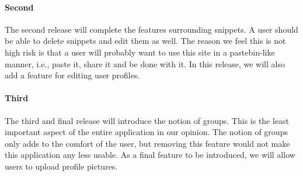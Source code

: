 \documentclass[10pt,a4paper,BCOR12mm, headexclude, footexclude,
  twoside, openright]{scrartcl}
\numberwithin{equation}{section} %
\numberwithin{figure}{section} %
\numberwithin{table}{section} %
\begin{document}
\paragraph{Second} The second release will complete the features surrounding
snippets. A user should be able to delete snippets and edit them as well. The
reason we feel this is not high risk is that a user will probably want to use
this site in a pastebin-like manner, i.e., paste it, share it and be done with
it. In this release, we will also add a feature for editing user profiles.

\paragraph{Third} The third and final release will introduce the notion of
groups. This is the least important aspect of the entire application in our
opinion. The notion of groups only adds to the comfort of the user, but removing this feature would not make this application any less usable. As a final feature to be introduced, we will allow users to upload profile pictures.





\end{document}
